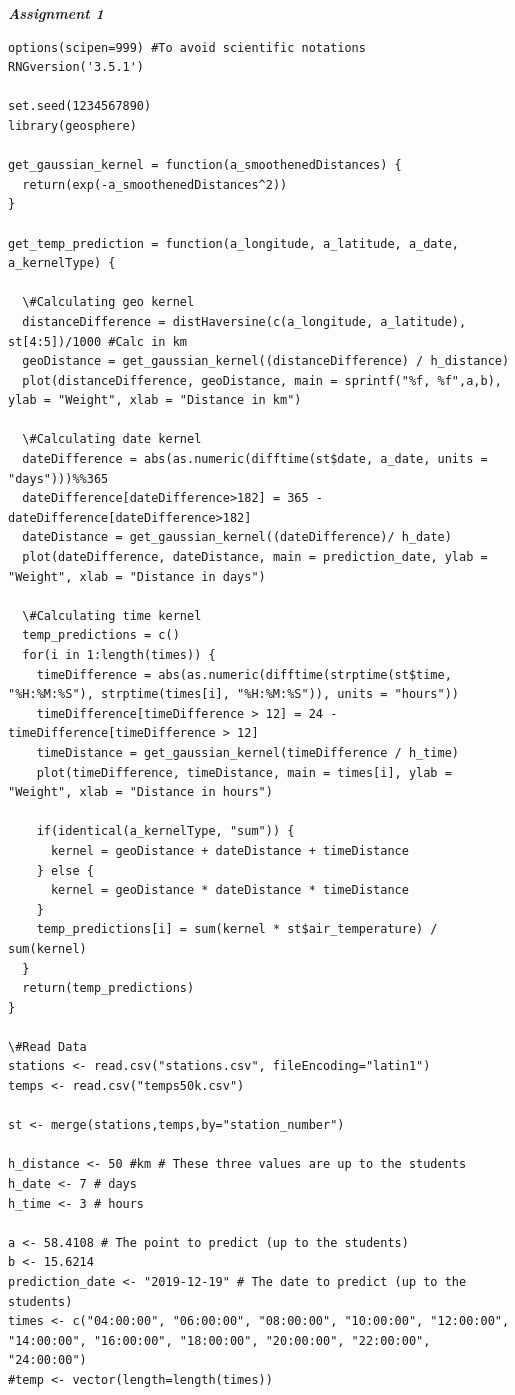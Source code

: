 \documentclass[a4paper,10pt]{article}
\begin{document}
\large \textit{\textbf{Assignment 1}} \par
\begin{lstlisting}
options(scipen=999) #To avoid scientific notations
RNGversion('3.5.1')

set.seed(1234567890)
library(geosphere)

get_gaussian_kernel = function(a_smoothenedDistances) {
  return(exp(-a_smoothenedDistances^2))
}

get_temp_prediction = function(a_longitude, a_latitude, a_date, a_kernelType) {

  \#Calculating geo kernel
  distanceDifference = distHaversine(c(a_longitude, a_latitude), st[4:5])/1000 #Calc in km
  geoDistance = get_gaussian_kernel((distanceDifference) / h_distance)
  plot(distanceDifference, geoDistance, main = sprintf("%f, %f",a,b), ylab = "Weight", xlab = "Distance in km")
  
  \#Calculating date kernel
  dateDifference = abs(as.numeric(difftime(st$date, a_date, units = "days")))%%365
  dateDifference[dateDifference>182] = 365 - dateDifference[dateDifference>182]
  dateDistance = get_gaussian_kernel((dateDifference)/ h_date)
  plot(dateDifference, dateDistance, main = prediction_date, ylab = "Weight", xlab = "Distance in days")

  \#Calculating time kernel
  temp_predictions = c()
  for(i in 1:length(times)) {
    timeDifference = abs(as.numeric(difftime(strptime(st$time, "%H:%M:%S"), strptime(times[i], "%H:%M:%S")), units = "hours"))
    timeDifference[timeDifference > 12] = 24 - timeDifference[timeDifference > 12]
    timeDistance = get_gaussian_kernel(timeDifference / h_time)
    plot(timeDifference, timeDistance, main = times[i], ylab = "Weight", xlab = "Distance in hours")
    
    if(identical(a_kernelType, "sum")) {
      kernel = geoDistance + dateDistance + timeDistance
    } else {
      kernel = geoDistance * dateDistance * timeDistance
    }
    temp_predictions[i] = sum(kernel * st$air_temperature) / sum(kernel)
  }
  return(temp_predictions)
}

\#Read Data
stations <- read.csv("stations.csv", fileEncoding="latin1")
temps <- read.csv("temps50k.csv")

st <- merge(stations,temps,by="station_number")

h_distance <- 50 #km # These three values are up to the students
h_date <- 7 # days
h_time <- 3 # hours

a <- 58.4108 # The point to predict (up to the students)
b <- 15.6214
prediction_date <- "2019-12-19" # The date to predict (up to the students)
times <- c("04:00:00", "06:00:00", "08:00:00", "10:00:00", "12:00:00", "14:00:00", "16:00:00", "18:00:00", "20:00:00", "22:00:00", "24:00:00")
#temp <- vector(length=length(times))


\end{lstlisting}
\end{document}
